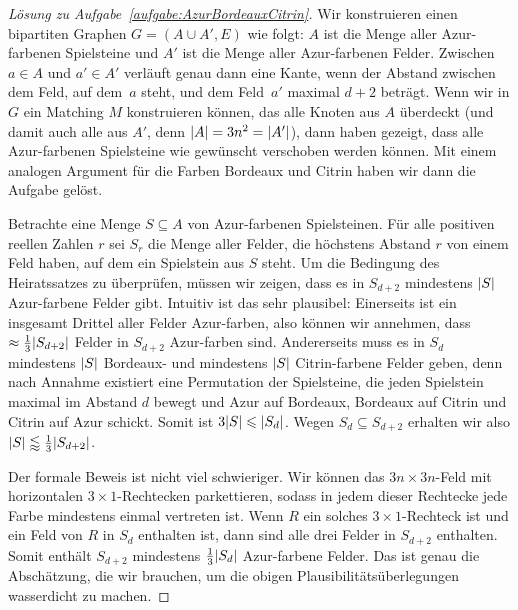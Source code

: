 \begin{proof}[Lösung zu Aufgabe~\ref{aufgabe:AzurBordeauxCitrin}]
	Wir konstruieren einen bipartiten Graphen $G=(A\cup A',E)$ wie folgt: $A$ ist die Menge aller Azur-farbenen Spielsteine und $A'$ ist die Menge aller Azur-farbenen Felder. Zwischen $a\in A$ und $a'\in A'$ verläuft genau dann eine Kante, wenn der Abstand zwischen dem Feld, auf dem~$a$ steht, und dem Feld~$a'$ maximal $d+2$ beträgt. Wenn wir in $G$ ein Matching $M$ konstruieren können, das alle Knoten aus $A$ überdeckt (und damit auch alle aus $A'$, denn $\lvert A\rvert=3n^2=\lvert A'\rvert$), dann haben gezeigt, dass alle Azur-farbenen Spielsteine wie gewünscht verschoben werden können. Mit einem analogen Argument für die Farben Bordeaux und Citrin haben wir dann die Aufgabe gelöst.
	
	Betrachte eine Menge $S\subseteq A$ von Azur-farbenen Spielsteinen. Für alle positiven reellen Zahlen $r$ sei $S_r$ die Menge aller Felder, die höchstens Abstand $r$ von einem Feld haben, auf dem ein Spielstein aus $S$ steht. Um die Bedingung des Heiratssatzes zu überprüfen, müssen wir zeigen, dass es in $S_{d+2}$ mindestens $\lvert S\rvert$ Azur-farbene Felder gibt. Intuitiv ist das sehr plausibel: Einerseits ist ein insgesamt Drittel aller Felder Azur-farben, also können wir annehmen, dass $\approx\frac13\lvert S_{d+2}\rvert$ Felder in $S_{d+2}$ Azur-farben sind. Andererseits muss es in $S_d$ mindestens $\lvert S\rvert$ Bordeaux- und mindestens $\lvert S\rvert$ Citrin-farbene Felder geben, denn nach Annahme existiert eine Permutation der Spielsteine, die jeden Spielstein maximal im Abstand $d$ bewegt und Azur auf Bordeaux, Bordeaux auf Citrin und Citrin auf Azur schickt. Somit ist $3\lvert S\rvert\leqslant \lvert S_d\rvert$. Wegen $S_d\subseteq S_{d+2}$ erhalten wir also $\lvert S\rvert\lessapprox \frac13\lvert S_{d+2}\rvert$.
	
	Der formale Beweis ist nicht viel schwieriger. Wir können das $3n\times 3n$-Feld mit horizontalen $3\times 1$-Rechtecken parkettieren, sodass in jedem dieser Rechtecke jede Farbe mindestens einmal vertreten ist. Wenn $R$ ein solches $3\times 1$-Rechteck ist und ein Feld von $R$ in $S_d$ enthalten ist, dann sind alle drei Felder in $S_{d+2}$ enthalten. Somit enthält $S_{d+2}$ mindestens $\frac13\lvert S_d\rvert$ Azur-farbene Felder. Das ist genau die Abschätzung, die wir brauchen, um die obigen Plausibilitätsüberlegungen wasserdicht zu machen.
\end{proof}